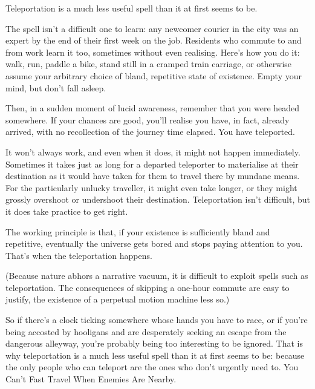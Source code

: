 Teleportation is a much less useful spell than it at first seems to
be.

The spell isn’t a difficult one to learn: any newcomer courier in the
city was an expert by the end of their first week on the
job. Residents who commute to and from work learn it too, sometimes
without even realising. Here’s how you do it: walk, run, paddle a
bike, stand still in a cramped train carriage, or otherwise assume
your arbitrary choice of bland, repetitive state of existence. Empty
your mind, but don’t fall asleep.

Then, in a sudden moment of lucid
awareness, remember that you were headed somewhere. If your chances
are good, you’ll realise you have, in fact, already arrived, with no
recollection of the journey time elapsed. You have teleported.

It won’t always work, and even when it does, it might not happen
immediately. Sometimes it takes just as long for a departed teleporter
to materialise at their destination as it would have taken for them to
travel there by mundane means. For the particularly unlucky traveller,
it might even take longer, or they might grossly overshoot or
undershoot their destination. Teleportation isn’t difficult, but it
does take practice to get right.

The working principle is that, if your existence is sufficiently bland
and repetitive, eventually the universe gets bored and stops paying
attention to you. That’s when the teleportation happens.

(Because nature abhors a narrative vacuum, it is difficult to exploit
spells such as teleportation. The consequences of skipping a one-hour
commute are easy to justify, the existence of a perpetual motion
machine less so.)

So if there’s a clock ticking somewhere whose hands you have to race,
or if you’re being accosted by hooligans and are desperately seeking
an escape from the dangerous alleyway, you’re probably being too
interesting to be ignored. That is why teleportation is a much less
useful spell than it at first seems to be: because the only people who
can teleport are the ones who don’t urgently need to. You Can't Fast
Travel When Enemies Are Nearby.
